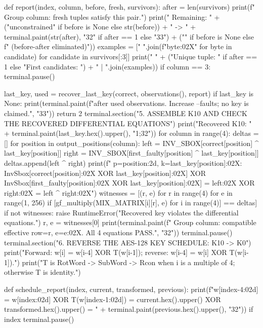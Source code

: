 \begin{lightcode}[numbers=left,firstnumber=1]
    def report(index, column, before, fresh, survivors):
        after = len(survivors)
        print(f"  Group {column}: {fresh} tuples satisfy this pair.")
        print("    Remaining: " + ("unconstrained" if before is None else str(before)) + " -> " + terminal.paint(str(after), "32" if after == 1 else "33") + ("" if before is None else f" ({before-after} eliminated)"))
        examples = [" ".join(f"{byte:02X}" for byte in candidate) for candidate in survivors[:3]]
        print("    " + ("Unique tuple: " if after == 1 else "First candidates: ") + " | ".join(examples))
        if column == 3:
            terminal.pause()

    last_key, used = recover_last_key(correct, observations(), report)
    if last_key is None:
        print(terminal.paint(f"\nAMBIGUOUS after {used} observations. Increase --faults; no key is claimed.", "33"))
        return 2
    terminal.section("5. ASSEMBLE K10 AND CHECK THE RECOVERED DIFFERENTIAL EQUATIONS")
    print("Recovered K10: " + terminal.paint(last_key.hex().upper(), "1;32"))
    for column in range(4):
        deltas = []
        for position in output_positions(column):
            left = INV_SBOX[correct[position] ^ last_key[position]]
            right = INV_SBOX[first_faulty[position] ^ last_key[position]]
            deltas.append(left ^ right)
            print(f"  p={position:2d}, k={last_key[position]:02X}: InvSbox[{correct[position]:02X} XOR {last_key[position]:02X}] XOR InvSbox[{first_faulty[position]:02X} XOR {last_key[position]:02X}] = {left:02X} XOR {right:02X} = {left ^ right:02X}")
        witnesses = [(r, e) for r in range(4) for e in range(1, 256) if [gf_multiply(MIX_MATRIX[i][r], e) for i in range(4)] == deltas]
        if not witnesses:
            raise RuntimeError("Recovered key violates the differential equations.")
        r, e = witnesses[0]
        print(terminal.paint(f"  Group {column}: compatible effective row={r}, e={e:02X}. All 4 equations PASS.", "32"))
    terminal.pause()
    terminal.section("6. REVERSE THE AES-128 KEY SCHEDULE: K10 -> K0")
    print("Forward: w[i] = w[i-4] XOR T(w[i-1]); reverse: w[i-4] = w[i] XOR T(w[i-1]).")
    print("T is RotWord -> SubWord -> Rcon when i is a multiple of 4; otherwise T is identity.")

    def schedule_report(index, current, transformed, previous):
        print(f"w[{index-4:02d}] = w[{index:02d}] XOR T(w[{index-1:02d}]) = {current.hex().upper()} XOR {transformed.hex().upper()} = " + terminal.paint(previous.hex().upper(), "32"))
        if index %
            terminal.pause()


\end{lightcode}
